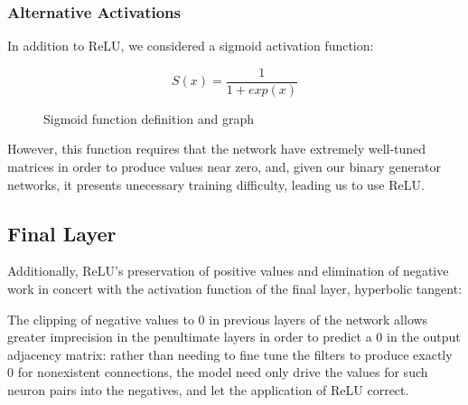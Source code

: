 \subsubsection{Alternative Activations}
In addition to ReLU, we considered a sigmoid activation function:

\begin{figure}[h]
	\centering
	\begin{minipage}{.48\textwidth}
		\begin{equation*}
			S(x) = \frac{1}{1 + exp(x)}
		\end{equation*}
	\end{minipage}
	\begin{minipage}{.35\textwidth}
	\end{minipage}
	\caption{Sigmoid function definition and graph}
	\label{fig:sigmoid}
\end{figure}\noindent
However, this function requires that the network have extremely well-tuned 
matrices in order to produce values near zero, and, given our binary generator 
networks, it presents unecessary training difficulty, leading us to use ReLU.


\subsection{Final Layer}
Additionally, ReLU's preservation of positive values and elimination of negative 
work in concert with the activation function of the final layer, hyperbolic 
tangent:

\begin{figure}[h]
	\centering
\end{figure}\noindent
The clipping of negative values to 0 in previous layers of the network allows 
greater imprecision in the penultimate layers in order to predict a 0 in the 
output adjacency matrix: rather than needing to fine tune the filters to produce 
exactly 0 for nonexistent connections, the model need only drive the values for 
such neuron pairs into the negatives, and let the application of ReLU correct.  

